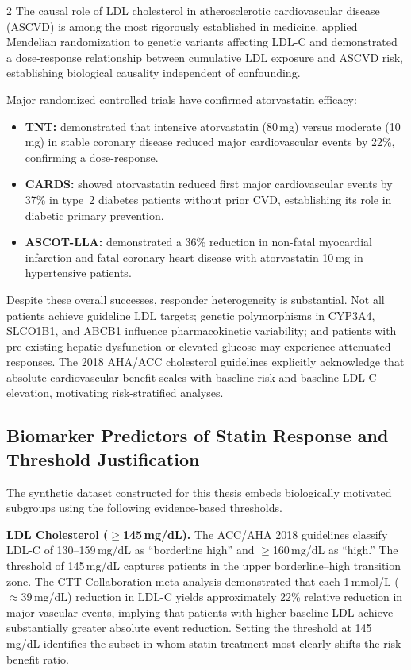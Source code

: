 \documentclass[12pt]{article}
\begin{document}
\begin{multicols}{2}
The causal role of LDL cholesterol in atherosclerotic cardiovascular disease
(ASCVD) is among the most rigorously established in medicine.
\citet{ference2017ldl} applied Mendelian randomization to genetic variants
affecting LDL-C and demonstrated a dose-response relationship between
cumulative LDL exposure and ASCVD risk, establishing biological causality
independent of confounding.

Major randomized controlled trials have confirmed atorvastatin efficacy:
\begin{itemize}
\item \textbf{TNT:} \citet{larosa2005intensive} demonstrated that intensive
  atorvastatin (80\,mg) versus moderate (10\,mg) in stable coronary disease
  reduced major cardiovascular events by 22\%, confirming a dose-response.
\item \textbf{CARDS:} \citet{colhoun2004primary} showed atorvastatin reduced
  first major cardiovascular events by 37\% in type~2 diabetes patients
  without prior CVD, establishing its role in diabetic primary prevention.
\item \textbf{ASCOT-LLA:} \citet{sever2003prevention} demonstrated a 36\%
  reduction in non-fatal myocardial infarction and fatal coronary heart
  disease with atorvastatin 10\,mg in hypertensive patients.
\end{itemize}

Despite these overall successes, responder heterogeneity is substantial.
Not all patients achieve guideline LDL targets; genetic polymorphisms in
CYP3A4, SLCO1B1, and ABCB1 influence pharmacokinetic variability; and
patients with pre-existing hepatic dysfunction or elevated glucose may
experience attenuated responses.  The 2018 AHA/ACC cholesterol guidelines
\citep{grundy2019aha} explicitly acknowledge that absolute cardiovascular
benefit scales with baseline risk and baseline LDL-C elevation, motivating
risk-stratified analyses.

\subsection{Biomarker Predictors of Statin Response and Threshold
Justification}

The synthetic dataset constructed for this thesis embeds biologically
motivated subgroups using the following evidence-based thresholds.

\textbf{LDL Cholesterol ($\geq$145\,mg/dL).}
The ACC/AHA 2018 guidelines classify LDL-C of 130--159\,mg/dL as ``borderline
high'' and $\geq$160\,mg/dL as ``high.''  The threshold of 145\,mg/dL
captures patients in the upper borderline--high transition zone.  The CTT
Collaboration meta-analysis \citep{baigent2010efficacy} demonstrated that each
1\,mmol/L ($\approx$39\,mg/dL) reduction in LDL-C yields approximately 22\%
relative reduction in major vascular events, implying that patients with
higher baseline LDL achieve substantially greater absolute event reduction.
Setting the threshold at 145\,mg/dL identifies the subset in whom statin
treatment most clearly shifts the risk-benefit ratio.


\end{multicols}
\end{document}

